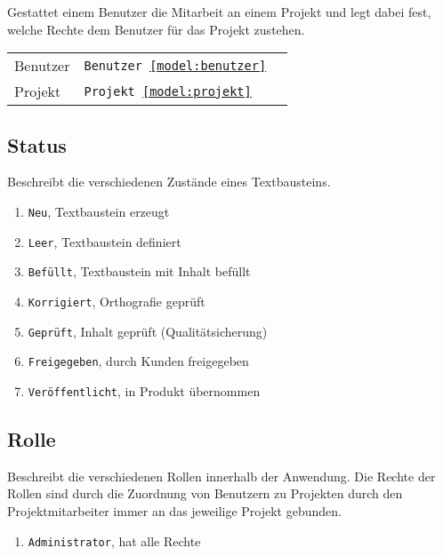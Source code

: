 Gestattet einem Benutzer die Mitarbeit an einem Projekt und legt dabei fest, welche Rechte dem Benutzer für das Projekt zustehen.

\begin{tabular}{@{}l l l}
\hline
Benutzer&\texttt{Benutzer \ref{model:benutzer}}&\\
Projekt&\texttt{Projekt \ref{model:projekt}}&\\
\hline
\end{tabular}

\subsection{Status}\label{model:status}

Beschreibt die verschiedenen Zustände eines Textbausteins.

\begin{enumerate}\itemsep -5pt
\item \texttt{Neu}, Textbaustein erzeugt
\item \texttt{Leer}, Textbaustein definiert
\item \texttt{Befüllt}, Textbaustein mit Inhalt befüllt
\item \texttt{Korrigiert}, Orthografie geprüft
\item \texttt{Geprüft}, Inhalt geprüft (Qualitätsicherung)
\item \texttt{Freigegeben}, durch Kunden freigegeben
\item \texttt{Veröffentlicht}, in Produkt übernommen
\end{enumerate}

\subsection{Rolle}\label{model:rolle}

Beschreibt die verschiedenen Rollen innerhalb der Anwendung. Die Rechte der Rollen sind durch die Zuordnung von Benutzern zu Projekten durch den Projektmitarbeiter immer an das jeweilige Projekt gebunden.

\begin{enumerate}\itemsep -5pt
\item \texttt{Administrator}, hat alle Rechte 
\end{enumerate}

\pagebreak